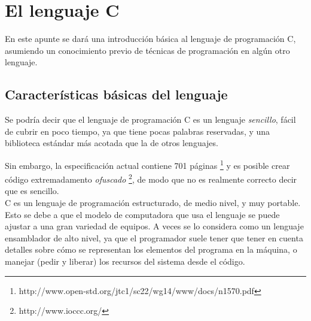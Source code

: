 
%

\renewcommand{\chaptermark}[1]{\markboth{#1}{}}
\renewcommand{\thesection}{\arabic{section}}
\chapter*{El lenguaje C}

En este apunte se dará una introducción básica al lenguaje de programación C,
asumiendo un conocimiento previo de técnicas de programación en algún otro
lenguaje.

\section{Características básicas del lenguaje}

Se podría decir que el lenguaje de programación C es un lenguaje
\textit{sencillo}, fácil de cubrir en poco tiempo, ya que tiene pocas palabras
reservadas, y una biblioteca estándar más acotada que la de otros lenguajes.

Sin embargo, la especificación actual contiene 701 páginas
\footnote{http://www.open-std.org/jtc1/sc22/wg14/www/docs/n1570.pdf} y es
posible crear código extremadamento \textit{ofuscado}
\footnote{http://www.ioccc.org/}, de modo que no es realmente correcto decir
que es sencillo. \\

C es un lenguaje de programación estructurado, de medio nivel, y muy portable.
Esto se debe a que el modelo de computadora que usa el lenguaje se puede
ajustar a una gran variedad de equipos. A veces se lo considera como un
lenguaje ensamblador de alto nivel, ya que el programador suele tener que
tener en cuenta detalles sobre cómo se representan los elementos del programa en
la máquina, o manejar (pedir y liberar) los recursos del sistema desde el
código.

